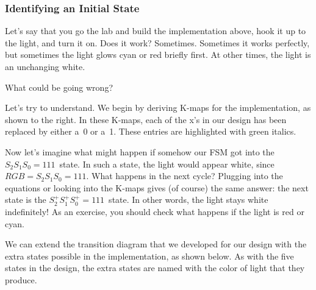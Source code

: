 \subsubsection{Identifying an Initial State}

Let's say that you go the lab and build the implementation above, 
hook it up
to the light, and turn it on.  Does it work?  Sometimes.
Sometimes it works perfectly, but sometimes
the light glows cyan or red briefly first.
At other times, the light is an
unchanging white.

\begin{minipage}{2.75in}
What could be going wrong?\mpline

Let's try to understand.  We begin by deriving
K-maps for the implementation, as shown to the right.  In these
K-maps, each of the x's in our design has been replaced by either a~0
or a~1.  These entries are highlighted with green italics.
\end{minipage}\hspace{.25in}%
\begin{minipage}{1.00in}
\end{minipage}\hspace{.25in}\begin{minipage}{1.00in}
\end{minipage}\hspace{.25in}\begin{minipage}{1.00in}
\end{minipage}

Now let's imagine what might happen if somehow our FSM got into the
$S_2S_1S_0=111$~state.  In such a state, the light would appear white,
since $RGB=S_2S_1S_0=111$.
%
What happens in the next cycle?
%
Plugging into the equations or looking into the K-maps gives (of
course) the same answer: the next state is the
$S_2^+S_1^+S_0^+=111$~state.
In other words, the light stays white indefinitely!
%
As an exercise, you should check what happens 
if the light is red or cyan.

We can extend the transition diagram that we developed for our design
with the extra states possible in the implementation, as shown below.
As with the five states in the design, the extra states are named with
the color of light that they produce.\\

\centerline{}

